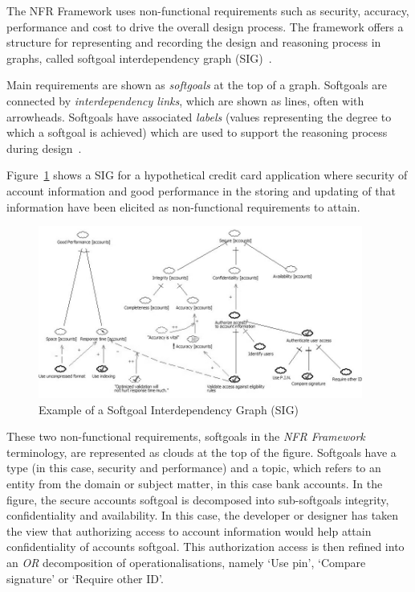 \documentclass[dissertation,final]{softeng}
\begin{document}
The NFR Framework uses non-functional requirements such as security, accuracy, performance and cost to drive the overall design process. The framework offers a structure for representing and recording the design and reasoning process in graphs, called softgoal interdependency graph (SIG)~\citep{Chung2000}. 

Main requirements are shown as \emph{softgoals} at the top of a graph. Softgoals are connected by \emph{interdependency links}, which are shown as lines, often with arrowheads. Softgoals have associated \emph{labels} (values representing the degree to which a softgoal is achieved) which are used to support the reasoning process during design~\citep{Chung2000}. 

Figure~\ref{fig:account_nfrs} shows a SIG for a hypothetical credit card application where security of account information and good performance in the storing and updating of that information have been elicited as non-functional requirements to attain.

\begin{figure}[h]
\includegraphics[width=0.95\textwidth]{AccountNFRs2}
\centering
\caption[Example of a Softgoal Interdependency Graph]{Example of a Softgoal Interdependency Graph (SIG)~\footnotemark}
\label{fig:account_nfrs}
\end{figure}

These two non-functional requirements, softgoals in the \emph{NFR Framework} terminology, are represented as clouds at the top of the figure. Softgoals have a type (in this case, security and performance) and a topic, which refers to an entity from the domain or subject matter, in this case bank accounts. In the figure, the secure accounts softgoal is decomposed into sub-softgoals integrity, confidentiality and availability. In this case, the developer or designer has taken the view that authorizing access to account information would help attain confidentiality of accounts softgoal. This authorization access is then refined into an \emph{OR} decomposition of operationalisations, namely `Use pin', `Compare signature' or `Require other ID'.
\end{document}
